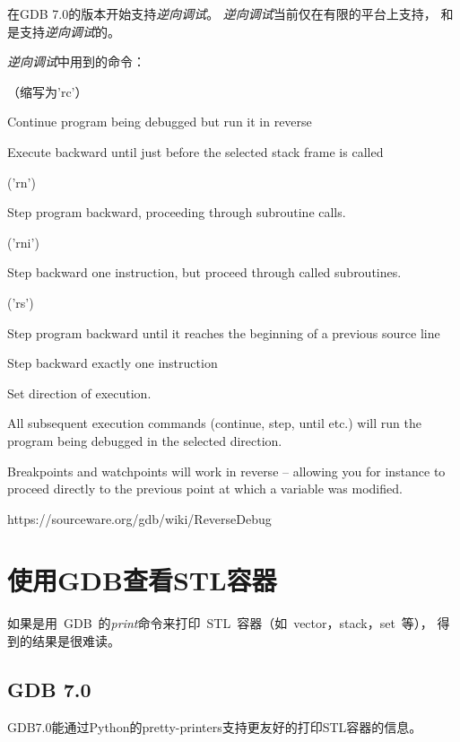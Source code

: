 在GDB 7.0的版本开始支持\emph{逆向调试}。
\emph{逆向调试}当前仅在有限的平台上支持，
和是支持\emph{逆向调试}的。

\emph{逆向调试}中用到的命令：

\noindent
{}（缩写为'rc'）

Continue program being debugged but run it in reverse

\noindent
{}

Execute backward until just before the selected stack frame is called

\noindent
{} ('rn')

Step program backward, proceeding through subroutine calls.

\noindent
{} ('rni')

Step backward one instruction, but proceed through called subroutines.


\noindent
{} ('rs')

Step program backward until it reaches the beginning of a previous source line

\noindent
{}

Step backward exactly one instruction

\noindent
{}

Set direction of execution.

All subsequent execution commands (continue, step, until etc.) will run the program being debugged in the selected direction.

Breakpoints and watchpoints will work in reverse -- allowing you for instance to proceed directly to the previous point at which a variable was modified.


https://sourceware.org/gdb/wiki/ReverseDebug



\section{使用GDB查看STL容器}

如果是用~GDB~的\emph{print}命令来打印~STL~容器（如~vector，stack，set~等），
得到的结果是很难读。

\subsection{GDB 7.0}
GDB7.0能通过Python的pretty-printers支持更友好的打印STL容器的信息。

